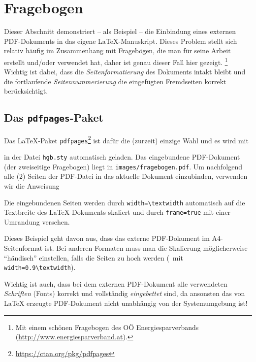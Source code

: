 \chapter{Fragebogen}


Dieser Abschnitt demonstriert -- als Beispiel -- die Einbindung eines externen PDF-Dokuments
in das eigene LaTeX-Manuskript.
Dieses Problem stellt sich relativ häufig im Zusammenhang mit Fragebögen, die
man für seine Arbeit erstellt und/oder verwendet hat, daher ist genau dieser Fall hier gezeigt.%
\footnote{Mit einem schönen Fragebogen des OÖ Energiesparverbands (\url{http://www.energiesparverband.at}).}
Wichtig ist dabei, dass die \emph{Seitenformatierung} des Dokuments intakt bleibt 
und die fortlaufende \emph{Seitennummerierung} die eingefügten Fremdseiten korrekt berücksichtigt.

\section{Das \texttt{pdfpages}-Paket}

Das LaTeX-Paket \texttt{pdfpages}\footnote{\url{https://ctan.org/pkg/pdfpages}}
ist dafür die (zurzeit) einzige Wahl und es wird mit 
%
\begin{LaTeXCode}[numbers=none]
\RequirePackage{pdfpages}
\end{LaTeXCode}
%
in der Datei \nolinkurl{hgb.sty} automatisch geladen.
Das eingebundene PDF-Dokument (der zweiseitige Frage\-bogen) liegt in
\nolinkurl{images/fragebogen.pdf}.
Um nachfolgend alle (2) Seiten der PDF-Datei in das aktuelle Dokument einzubinden,
verwenden wir die Anweisung  
%
\begin{LaTeXCode}[numbers=none]

\end{LaTeXCode}
%
Die eingebundenen Seiten werden durch \verb!width=\textwidth! automatisch auf die Textbreite
des LaTeX-Dokuments skaliert und durch \verb!frame=true! mit einer Umrandung versehen.

Dieses Beispiel geht davon aus, dass das externe PDF-Dokument im A4-Seitenformat ist.
Bei anderen Formaten muss man die Skalierung möglicherweise "`händisch"' einstellen,
falls die Seiten zu hoch werden (\zB\ mit \verb!width=0.9\textwidth!).

Wichtig ist auch, dass bei dem externen PDF-Dokument alle verwendeten \emph{Schriften}
(Fonts) korrekt und vollständig \emph{eingebettet} sind, da ansonsten das von LaTeX erzeugte 
PDF-Dokument nicht unabhängig von der Systemumgebung ist!


